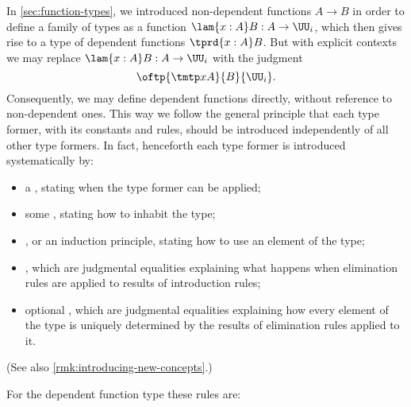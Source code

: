 In \cref{sec:function-types}, we introduced non-dependent functions $A\to B$ in
order to define a family of types as a function $\lam{x:A} B:A\to\UU_i$, which
then gives rise to a type of dependent functions $\tprd{x:A} B$. But with explicit contexts
we may replace $\lam{x:A} B:A\to\UU_i$ with the judgment
%
\begin{equation*}
  \oftp{\tmtp xA}{B}{\UU_i}.
\end{equation*}
%
Consequently, we may define dependent functions directly, without reference to non-dependent ones. This way we follow the general principle that each type former, with its constants and rules, should be introduced independently of all other type formers.
%
In fact, henceforth each type former is introduced systematically by:
\begin{itemize}
\item a , stating when the type former can be applied;
\item some , stating how to inhabit the type;
\item {}, or an induction principle, stating how to use an
  element of the type;
\item {}, which are judgmental equalities explaining what happens when elimination rules are applied to results of introduction rules;
\item optional , which are judgmental equalities explaining how every element of the type is uniquely determined by the results of elimination rules applied to it.
\end{itemize}
(See also \cref{rmk:introducing-new-concepts}.)

For the dependent function type these rules are:
%

